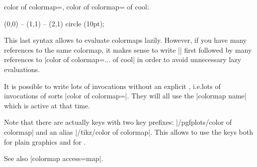 \begin{pgfplotskeylist}{%
    color of colormap=,
    color of colormap= of %
}
    cool: 

\begin{codeexample}[]
\tikz\fill [color of colormap={300 of colormap/cool},
    thick,draw=.!60!black]
        (0,0) -- (1,1) -- (2,1) circle (10pt);
\end{codeexample}

    This last syntax allows to evaluate colormaps lazily. However, if you have
    many references to the same colormap, it makes sense to write
    |\pgfplotsset{colormap/cool}| first followed by many references to
    |color of colormap={... of cool}| in order to avoid unnecessary lazy
    evaluations.

    It is possible to write lots of invocations without an explicit
    , i.e.\@ lots of invocations of sorts
    |color of colormap=|. They will all use the |colormap name|
    which is active at that time.

    Note that there are actually keys with two key prefixes:
    |/pgfplots/color of colormap| and an alias |/tikz/color of colormap|. This
    allows to use the keys both for plain \tikzname{} graphics and for
    \PGFPlots{}.

    See also |colormap access=map|.
\end{pgfplotskeylist}

